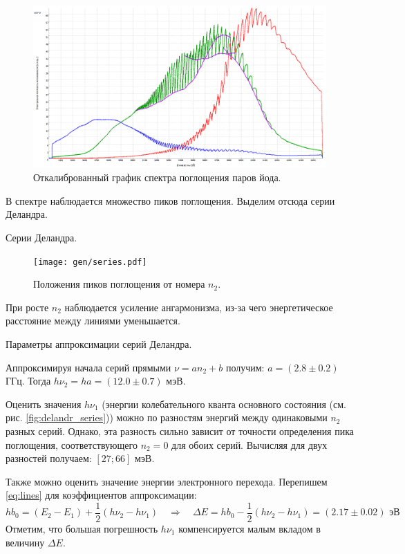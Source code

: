 \documentclass[12pt,a4paper]{article}
\newcommand{\figref}[1]{(см. рис. \ref{#1})}
\begin{document}
	\begin{figure}[H]
		\centering
		\includegraphics[width=0.8\linewidth]{data/326_2/spectrum.edit.png}
		\caption{Откалиброванный график спектра поглощения паров йода.}
		\label{fig:iodine_spectrum}
	\end{figure}
	
	В спектре наблюдается множество пиков поглощения. Выделим отсюда серии Деландра. 
	
	\begin{table}[H]
		\footnotesize
		
		\caption{Серии Деландра.}
		\label{tab:data}
	\end{table}
	
	\begin{figure}[H]
		\centering
		\texttt{[image: gen/series.pdf]}
		\caption{Положения пиков поглощения от номера $n_2$.}
		\label{fig:series}
	\end{figure}
	
	При росте $n_2$ наблюдается усиление ангармонизма, из-за чего энергетическое расстояние между линиями уменьшается.
	
	\begin{table}[H]
		\footnotesize
		
		\caption{Параметры аппроксимации серий Деландра.}
		\label{tab:mnk}
	\end{table}
	
	Аппроксимируя начала серий прямыми $\nu = a n_2 + b$ получим:
	$a = (2.8 \pm 0.2)$ ГГц.
	Тогда $h \nu_2 = h a = (12.0 \pm 0.7)$ мэВ.
	
	Оценить значения $h \nu_1$ (энергии колебательного кванта основного состояния \figref{fig:delandr_series}) можно по разностям энергий между одинаковыми $n_2$ разных серий. Однако, эта разность сильно зависит от точности определения пика поглощения, соответствующего $n_2 = 0$ для обоих серий.
	Вычисляя для двух разностей получаем: $[ 27 ; 66 ]$ мэВ.
	
	Также можно оценить значение энергии электронного перехода. Перепишем \eqref{eq:lines} для коэффициентов аппроксимации:
	$$ h b_0 = (E_2 - E_1) + \frac{1}{2} (h \nu_2 - h \nu_1) \quad \Rightarrow \quad \Delta E = h b_0 - \frac{1}{2} (h \nu_2 - h \nu_1) = (2.17 \pm 0.02) \text{ эВ} $$
	Отметим, что большая погрешность $h \nu_1$ компенсируется малым вкладом в величину $\Delta E$.
	
\end{document}

